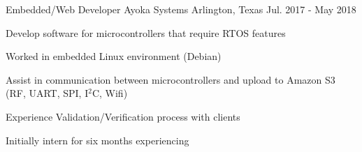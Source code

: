 \begin{cventries}
\cventry
{Embedded/Web Developer} %
{Ayoka Systems} %
{Arlington, Texas} %
{Jul. 2017 - May 2018} %
{ %
\begin{cvitems}
\item {Develop software for microcontrollers that require RTOS features}
\item {Worked in embedded Linux environment (Debian)}
\item {Assist in communication between microcontrollers and upload to Amazon S3 (RF, UART, SPI, I$^2$C, Wifi)}
\item {Experience Validation/Verification process with clients}
\item {Initially intern for six months experiencing }
\end{cvitems}
}

\end{cventries}